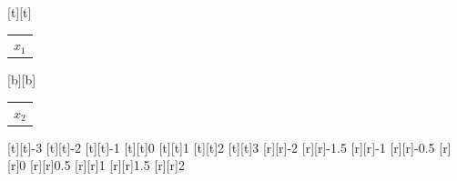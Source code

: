 %    
%
%
\begin{psfrags}%
\psfragscanon%
%
[t][t]{\setlength{\tabcolsep}{0pt}\begin{tabular}{c}$x_1$\end{tabular}}%
[b][b]{\setlength{\tabcolsep}{0pt}\begin{tabular}{c}$x_2$\end{tabular}}%
%
[t][t]{-3}%
[t][t]{-2}%
[t][t]{-1}%
[t][t]{0}%
[t][t]{1}%
[t][t]{2}%
[t][t]{3}%
%
[r][r]{-2}%
[r][r]{-1.5}%
[r][r]{-1}%
[r][r]{-0.5}%
[r][r]{0}%
[r][r]{0.5}%
[r][r]{1}%
[r][r]{1.5}%
[r][r]{2}%
%
%
\end{psfrags}%
%
